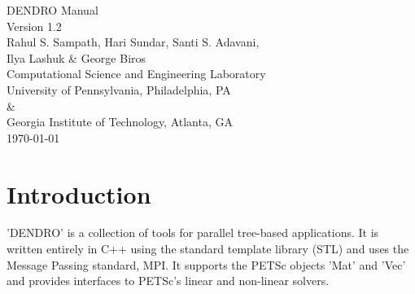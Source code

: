 \documentclass[10pt,reqno,a4paper]{report}
\numberwithin{equation}{section}
\begin{document}
\begin{titlepage}

\begin{center}

{\large DENDRO Manual }\\[1cm]

{\large Version 1.2 }\\[2cm]

{\large Rahul S. Sampath, Hari Sundar, Santi S. Adavani,}\\
{\large Ilya Lashuk \& George Biros}\\[2cm]

{\large Computational Science and Engineering Laboratory}\\[2cm]

{\large University of Pennsylvania, Philadelphia, PA}\\[1cm]
{\&}\\[1cm]
{\large Georgia Institute of Technology, Atlanta, GA}\\[2cm]

{\large \today}

\end{center}

\end{titlepage}

\newpage

\tableofcontents

\newpage

\lstset{language=c++}
\lstset{commentstyle=\textit\scriptsize}
\lstset{numbers=none}
\lstset{basicstyle=\scriptsize}

\chapter{Introduction}
\label{sec:introduction}
'DENDRO' is a collection of tools for parallel tree-based applications. It is written entirely in C++ using the standard template library (STL) and uses the Message Passing standard, MPI. It supports the PETSc objects 'Mat' and 'Vec' and provides interfaces to PETSc's linear and non-linear solvers.
\end{document}
